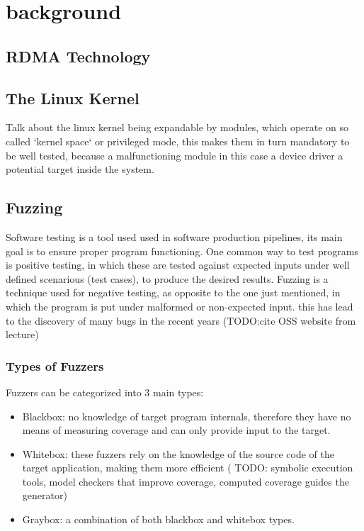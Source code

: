 \section{background}



\subsection{RDMA Technology}


\subsection{The Linux Kernel}

Talk about the linux kernel being expandable by modules, which operate on
so called `kernel space` or privileged mode, this makes them in turn mandatory
to be well tested, because  a malfunctioning module in this case a device 
driver a potential target inside the system.

\subsection{Fuzzing}

Software testing is a tool used used in software production pipelines, its main goal is to ensure proper program functioning. One common way to test programs is 
positive testing, in which these are tested against expected inputs under well defined scenarious (test cases), to produce the desired results.
Fuzzing is a technique used for negative testing, as opposite to the one just mentioned, in which the program is put under malformed or non-expected input. this
has lead to the discovery of many bugs in the recent years (TODO:\@ cite OSS website from lecture)


\subsubsection{Types of Fuzzers}
 
Fuzzers can be categorized into 3 main types\cite{fetzer20}:

\begin{itemize}
    \item Blackbox: no knowledge of target program internals, therefore they have no means of measuring coverage and can only provide input to the target.
    \item Whitebox: these fuzzers rely on the knowledge of the source code of the target application, making them more efficient ( TODO: symbolic execution tools, model checkers that improve coverage, computed coverage guides the generator)
    \item Graybox: a combination of both blackbox and whitebox types.
\end{itemize}




